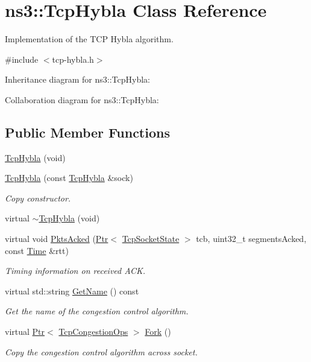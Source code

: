 \hypertarget{classns3_1_1TcpHybla}{}\section{ns3\+:\+:Tcp\+Hybla Class Reference}
\label{classns3_1_1TcpHybla}


Implementation of the T\+CP Hybla algorithm.  




{\ttfamily \#include $<$tcp-\/hybla.\+h$>$}



Inheritance diagram for ns3\+:\+:Tcp\+Hybla\+:


Collaboration diagram for ns3\+:\+:Tcp\+Hybla\+:
\subsection*{Public Member Functions}
\begin{DoxyCompactItemize}
\item 
\hyperlink{classns3_1_1TcpHybla_afa16f70558054d036592ef9aeaa0ef6e}{Tcp\+Hybla} (void)
\item 
\hyperlink{classns3_1_1TcpHybla_ac5f43582228310d30e541c9ead8558fb}{Tcp\+Hybla} (const \hyperlink{classns3_1_1TcpHybla}{Tcp\+Hybla} \&sock)
\begin{DoxyCompactList}\small\item\em Copy constructor. \end{DoxyCompactList}\item 
virtual \hyperlink{classns3_1_1TcpHybla_a79d8b406e07b1b76d318c9849f81ffb1}{$\sim$\+Tcp\+Hybla} (void)
\item 
virtual void \hyperlink{classns3_1_1TcpHybla_a23e291ec4fe822d1abd9d1810c961cb8}{Pkts\+Acked} (\hyperlink{classns3_1_1Ptr}{Ptr}$<$ \hyperlink{classns3_1_1TcpSocketState}{Tcp\+Socket\+State} $>$ tcb, uint32\+\_\+t segments\+Acked, const \hyperlink{classns3_1_1Time}{Time} \&rtt)
\begin{DoxyCompactList}\small\item\em Timing information on received A\+CK. \end{DoxyCompactList}\item 
virtual std\+::string \hyperlink{classns3_1_1TcpHybla_a5f2c0e4bbceebf35436b596effecf1a7}{Get\+Name} () const 
\begin{DoxyCompactList}\small\item\em Get the name of the congestion control algorithm. \end{DoxyCompactList}\item 
virtual \hyperlink{classns3_1_1Ptr}{Ptr}$<$ \hyperlink{classns3_1_1TcpCongestionOps}{Tcp\+Congestion\+Ops} $>$ \hyperlink{classns3_1_1TcpHybla_a43ce1d6a0ee818a29988fdc9f9b1f6bb}{Fork} ()
\begin{DoxyCompactList}\small\item\em Copy the congestion control algorithm across socket. \end{DoxyCompactList}\end{DoxyCompactItemize}
